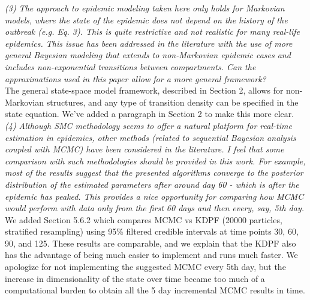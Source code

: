 \documentclass{article}
\newcommand{\danny}[1]{{\color{blue} DANNY: #1}}
\begin{document}


\noindent \emph{(3) The approach to epidemic modeling taken here only holds for Markovian models, where the state of the epidemic does not depend on the history of the outbreak (e.g. Eq. 3). This is quite restrictive and not realistic for many real-life epidemics. This issue has been addressed in the literature with the use of more general Bayesian modeling that extends to non-Markovian epidemic cases and includes non-exponential transitions between compartments. Can the approximations used in this paper allow for a more general framework?} \\

The general state-space model framework, described in Section 2, allows for non-Markovian structures, and any type of transition density can be specified in the state equation. We've added a paragraph in Section 2 to make this more clear. \\

\noindent \emph{(4) Although SMC methodology seems to offer a natural platform for real-time estimation in epidemics, other methods (related to sequential Bayesian analysis coupled with MCMC) have been considered in the literature. I feel that some comparison with such methodologies should be provided in this work. For example, most of the results suggest that the presented algorithms converge to the posterior distribution of the estimated parameters after around day 60 - which is after the epidemic has peaked. This provides a nice opportunity for comparing how MCMC would perform with data only from the first 60 days and then every, say, 5th day.} \\

We added Section 5.6.2  which compares MCMC vs KDPF (20000 particles, stratified resampling) using 95\% filtered credible intervals at time points 30, 60, 90, and 125. These results are comparable, and we explain that the KDPF also has the advantage of being much easier to implement and runs much faster. We apologize for not implementing the suggested MCMC every 5th day, but the increase in dimensionality of the state over time became too much of a computational burden to obtain all the 5 day incremental MCMC results in time.  \\
\end{document}
